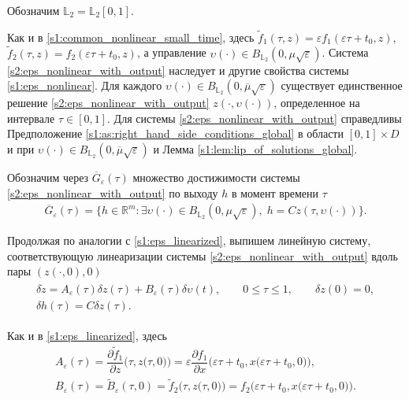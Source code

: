 \documentclass[../main.tex]{subfiles}
\begin{document}
Обозначим $\mathbb{L}_2 = \mathbb{L}_2[0, 1]$. 

Как и в \eqref{s1:common_nonlinear_small_time}, здесь $ \widetilde{f}_1(\tau,z) = \varepsilon f_1(\varepsilon \tau + t_0, z) $, $ \widetilde{f}_2 (\tau,z) = f_2(\varepsilon \tau + t_0,z)$, а управление $ \upsilon(\cdot) \in B_{\mathbb{L}_2}(0, \mu\sqrt{\varepsilon})$.
Система \eqref{s2:eps_nonlinear_with_output} наследует и другие свойства системы \eqref{s1:eps_nonlinear}.
Для каждого $\upsilon(\cdot) \in B_{\mathbb{L}_2} (0, \overline{\mu} \sqrt{\varepsilon})$ существует единственное решение \eqref{s2:eps_nonlinear_with_output}  $z(\cdot, \upsilon(\cdot))$, определенное на интервале $\tau \in [0,1]$. 
Для системы \eqref{s2:eps_nonlinear_with_output} справедливы Предположение \ref{s1:as:right_hand_side_conditions_global} в области $[0, 1]\times D$ и при $\upsilon(\cdot) \in B_{\mathbb{L}_2}(0, \overline{\mu}\sqrt{\varepsilon}) $ и 
Лемма \ref{s1:lem:lip_of_solutions_global}.

Обозначим через $\overline{G}_{\varepsilon}(\tau)$ множество достижимости системы \eqref{s2:eps_nonlinear_with_output} по выходу $h$ в момент времени $\tau$
\begin{gather*}
	\overline{G}_{\varepsilon}(\tau)=\{h\in \mathbb{R}^m:\exists \upsilon(\cdot)\in B_{\mathbb{L}_2}(0,\mu\sqrt{\varepsilon}),\; h=Cz(\tau,\upsilon(\cdot))\}.
\end{gather*}

Продолжая по аналогии с \eqref{s1:eps_linearized}, выпишем линейную систему, соответствующую линеаризации системы  \eqref{s2:eps_nonlinear_with_output} вдоль пары $(z(\cdot, 0), 0)$ 
\begin{gather}\label{s2:eps_linearized}
\begin{gathered}
	\delta\dot{z} = A_{\varepsilon}(\tau) \delta z(\tau) + B_{\varepsilon}(\tau) \delta \upsilon(t),\qquad 0 \leqslant \tau \leqslant 1,  \qquad \delta z(0) = 0, \\
	\delta h(\tau) = C \delta z(\tau).
\end{gathered}
\end{gather}

Как и в \eqref{s1:eps_linearized}, здесь 
\begin{gather*}
	A_{\varepsilon}(\tau) = \dfrac{\partial \widetilde{f}_1}{\partial z} \Big(\tau, z\big(\tau, 0 \big)\Big) = \varepsilon \dfrac{\partial f_1}{\partial x} \Big(\varepsilon \tau + t_0 ,x\big(\varepsilon \tau + t_0, 0\big)\Big),  \\
	B_{\varepsilon}(\tau) = \widetilde{B}_{\varepsilon}(\tau, 0) = \widetilde{f}_2 \Big(\tau,z\big(\tau, 0\big)\Big) = f_2 \Big(\varepsilon \tau + t_0, x\big(\varepsilon \tau + t_0, 0\big)\Big).
\end{gather*}  
\end{document}
